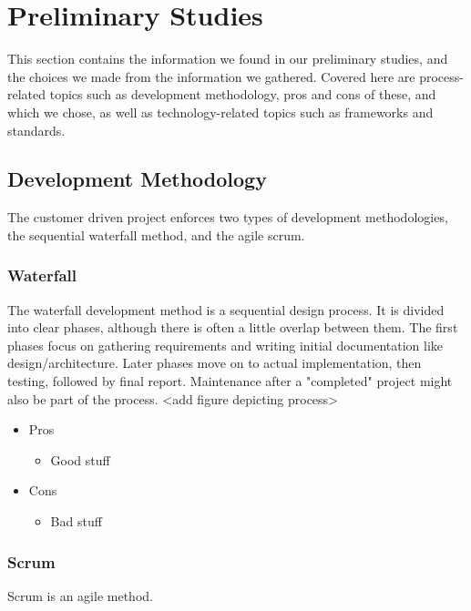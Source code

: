 \section{Preliminary Studies}
This section contains the information we found in our preliminary studies, and the choices we made from the information we gathered. Covered here are process-related topics such as development methodology, pros and cons of these, and which we chose, as well as technology-related topics such as frameworks and standards.
\subsection{Development Methodology}
The customer driven project enforces two types of development methodologies, the sequential waterfall method, and the agile scrum.
\subsubsection{Waterfall}
The waterfall development method is a sequential design process. It is divided into clear phases, although there is often a little overlap between them. The first phases focus on gathering requirements and writing initial documentation like design/architecture. Later phases move on to actual implementation, then testing, followed by final report. Maintenance after a "completed" project might also be part of the process. <add figure depicting process>
\begin{itemize}
	\item Pros
	\begin{itemize}
		\item Good stuff
	\end{itemize}
\end{itemize}
\begin{itemize}
	\item Cons
	\begin{itemize}
		\item Bad stuff
	\end{itemize}
\end{itemize}
\subsubsection{Scrum}
Scrum is an agile method.
